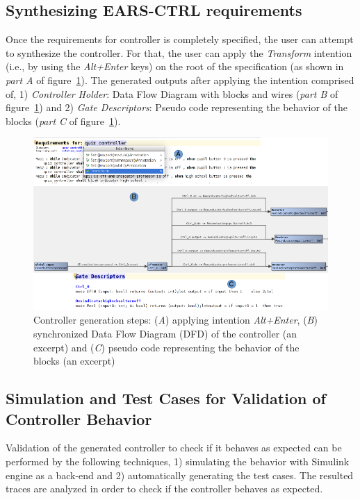 \subsection{Synthesizing \textsf{EARS-CTRL} requirements}
\vspace{-.2cm}
Once the requirements for controller is completely specified, the user can
attempt to synthesize the controller. For that, the user can apply the
\emph{Transform} intention (i.e., by using the \emph{Alt+Enter} keys) on the root of the specification (as
shown in \emph{part A} of figure~\ref{fig:Spec_transform}). The generated outputs after applying the
intention comprised of, 1) \emph{Controller Holder}: Data Flow
Diagram with blocks and wires (\emph{part B} of figure~\ref{fig:Spec_transform})
and 2) \emph{Gate Descriptors}: Pseudo code representing the behavior of the
blocks (\emph{part C} of figure~\ref{fig:Spec_transform}).
\begin{figure}[!h]
\centering
\includegraphics[width=1\textwidth]{./images/Transform.png}
\caption{Controller generation steps: (\emph{A}) applying intention \emph{Alt+Enter},
(\emph{B}) synchronized Data Flow Diagram (DFD) of the controller (an excerpt)
and (\emph{C}) pseudo code representing the behavior of the blocks (an excerpt)}
\label{fig:Spec_transform}
\end{figure}
\vspace{-.5cm}
\subsection{Simulation and Test Cases for Validation of Controller Behavior}
\vspace{-.2cm}
Validation of the generated controller to check if it behaves as expected can be
performed by the following techniques, 1) simulating the behavior with Simulink engine \cite{MatlabSimulink} as a back-end and 2) automatically generating the test cases.
The resulted traces are analyzed in order to check if the controller behaves as expected.
